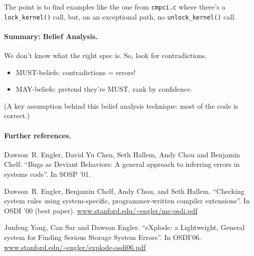 \documentclass[11pt]{article}
\begin{document}
The point is to find examples like the one from {\tt cmpci.c}
where there's a {\tt lock\_kernel()} call, but, on an exceptional path, no
{\tt unlock\_kernel()} call.
\vspace*{-1em}

\paragraph{Summary: Belief Analysis.}
      We don't know what the right spec is.
      So, look for contradictions.

\begin{itemize}[noitemsep]
\item      MUST-beliefs: contradictions = errors!
\item      MAY-beliefs: pretend they're MUST, rank by confidence.
\end{itemize}
(A key assumption behind this belief analysis technique: most of the code is correct.)

\paragraph{Further references.}
Dawson~R. Engler, David Yu Chen, Seth Hallem, Andy Chou and Benjamin Chelf.
``Bugs as Deviant Behaviors: A general approach to inferring errors in systems code''.
In SOSP '01.

Dawson~R. Engler, Benjamin Chelf, Andy Chou, and Seth Hallem.
``Checking system rules using system-specific, programmer-written
  compiler extensions''.
In OSDI '00 (best paper).
\url{www.stanford.edu/~engler/mc-osdi.pdf}

Junfeng Yang, Can Sar and Dawson Engler.
``eXplode: a Lightweight, General system for Finding Serious Storage System Errors''.
In OSDI'06.
\url{www.stanford.edu/~engler/explode-osdi06.pdf}
\end{document}
